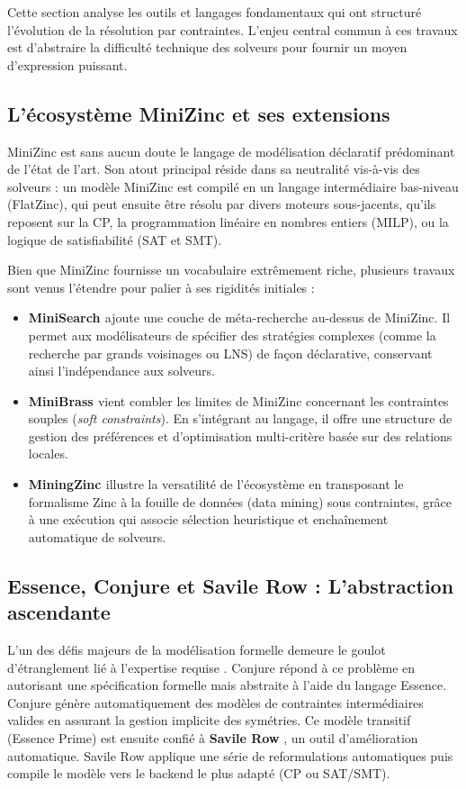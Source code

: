 
Cette section analyse les outils et langages fondamentaux qui ont structuré l'évolution de la résolution par contraintes. L'enjeu central commun à ces travaux est d'abstraire la difficulté technique des solveurs pour fournir un moyen d'expression puissant.

\subsection{L'écosystème MiniZinc et ses extensions}
MiniZinc \cite{GL1, GL2} est sans aucun doute le langage de modélisation déclaratif prédominant de l'état de l'art. Son atout principal réside dans sa neutralité vis-à-vis des solveurs : un modèle MiniZinc est compilé en un langage intermédiaire bas-niveau (FlatZinc), qui peut ensuite être résolu par divers moteurs sous-jacents, qu'ils reposent sur la CP, la programmation linéaire en nombres entiers (MILP), ou la logique de satisfiabilité (SAT et SMT). 

Bien que MiniZinc fournisse un vocabulaire extrêmement riche, plusieurs travaux sont venus l'étendre pour palier à ses rigidités initiales :
\begin{itemize}
    \item \textbf{MiniSearch \cite{rendl2015minisearch}} ajoute une couche de méta-recherche au-dessus de MiniZinc. Il permet aux modélisateurs de spécifier des stratégies complexes (comme la recherche par grands voisinages ou LNS) de façon déclarative, conservant ainsi l'indépendance aux solveurs.
    \item \textbf{MiniBrass \cite{GL4}} vient combler les limites de MiniZinc concernant les contraintes souples (\textit{soft constraints}). En s'intégrant au langage, il offre une structure de gestion des préférences et d'optimisation multi-critère basée sur des relations locales.
    \item \textbf{MiningZinc \cite{guns2017miningzinc}} illustre la versatilité de l'écosystème en transposant le formalisme Zinc à la fouille de données (data mining) sous contraintes, grâce à une exécution qui associe sélection heuristique et enchaînement automatique de solveurs.
\end{itemize}

\subsection{Essence, Conjure et Savile Row : L'abstraction ascendante}
L'un des défis majeurs de la modélisation formelle demeure le goulot d'étranglement lié à l'expertise requise \cite{akgun2013automated}. 
Conjure \cite{akgun2022conjure} répond à ce problème en autorisant une spécification formelle mais abstraite à l'aide du langage Essence. Conjure génère automatiquement des modèles de contraintes intermédiaires valides en assurant la gestion implicite des symétries. Ce modèle transitif (Essence Prime) est ensuite confié à \textbf{Savile Row} \cite{nightingale2017automatically}, un outil d'amélioration automatique. Savile Row applique une série de reformulations automatiques puis compile le modèle vers le backend le plus adapté (CP ou SAT/SMT).


